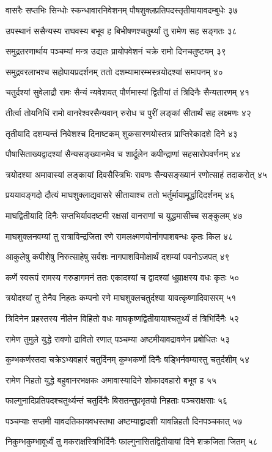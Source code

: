 वासरैः सप्तभिः सिन्धोः स्कन्धावारनिवेशनम्
पौषशुक्लप्रतिपदस्तृतीयायावदम्बुधेः ३७

उपस्थानं ससैन्यस्य राघवस्य बभूव ह
बिभीषणश्चतुर्थ्यां तु रामेण सह सङ्गतः ३८

समुद्रतरणार्थाय पञ्चम्यां मन्त्र उद्यतः
प्रायोपवेशनं चक्रे रामो दिनचतुष्टयम् ३९

समुद्रवरलाभश्च सहोपायप्रदर्शनम्
ततो दशम्यामारम्भस्त्रयोदश्यां समापनम् ४०

चतुर्दश्यां सुवेलाद्रौ रामः सैन्यं न्यवेशयत्
पौर्णमास्यां द्वितीयां तं त्रिदिनैः सैन्यतारणम् ४१

तीर्त्वा तोयनिधिं रामो वानरेश्वरसैन्यवान्
रुरोध च पुरीं लङ्कां सीतार्थं सह लक्ष्मणः ४२

तृतीयादि दशम्यन्तं निवेशश्च दिनाष्टकम्
शुकसारणयोस्तत्र प्राप्तिरेकादशे दिने ४३

पौषासिताख्यद्वादश्यां सैन्यसङ्ख्यानमेव च
शार्दूलेन कपीन्द्राणां सहसारोपवर्णनम् ४४

त्रयोदश्या अमावास्यां लङ्कायां दिवसैस्त्रिभिः
रावणः सैन्यसङ्ख्यानं रणोत्साहं तदाकरोत् ४५

प्रययावङ्गदो दौत्यं माघशुक्लाद्यवासरे
सीतायाश्च ततो भर्तुर्मायामूर्द्धादिदर्शनम् ४६

माघद्वितीयादि दिनैः सप्तभिर्यावदष्टमी
रक्षसां वानराणां च युद्धमासीच्च सङ्कुलम् ४७

माघशुक्लनवम्यां तु रात्राविन्द्रजिता रणे
रामलक्ष्मणयोर्नागपाशबन्धः कृतः किल ४८

आकुलेषु कपीशेषु निरुत्साहेषु सर्वशः
नागपाशविमोक्षार्थं दशम्यां पवनोऽजपत् ४९

कर्णे स्वरूपं रामस्य गरुडागमनं ततः
एकादश्यां च द्वादश्यां धूम्राक्षस्य वधः कृतः ५०

त्रयोदश्यां तु तेनैव निहतः कम्पनो रणे
माघशुक्लचतुर्दश्या यावत्कृष्णादिवासरम् ५१

त्रिदिनेन प्रहस्तस्य नीलेन विहितो वधः
माघकृष्णद्वितीयायाश्चतुर्थ्यं तं त्रिभिर्दिनैः ५२

रामेण तुमुले युद्धे रावणो द्रावितो रणात्
पञ्चम्या अष्टमीयावद्रावणेन प्रबोधितः ५३

कुम्भकर्णस्तदा चक्रेऽभ्यवहारं चतुर्दिनम्
कुम्भकर्णो दिनैः षड्भिर्नवम्यास्तु चतुर्दशीम् ५४

रामेण निहतो युद्धे बहुवानरभक्षकः
अमावास्यादिने शोकादवहारो बभूव ह ५५

फाल्गुनादिप्रतिपदश्चतुर्थ्यन्तं चतुर्दिनैः
बिसतन्तुप्रभृतयो निहताः पञ्चराक्षसाः ५६

पञ्चम्याः सप्तमी यावदतिकायवधस्तथा
अष्टम्याद्वादशी यावन्निहतौ दिनपञ्चकात् ५७

निकुम्भकुम्भावूर्ध्वं तु मकराक्षस्त्रिभिर्दिनैः
फाल्गुनासितद्वितीयायां दिने शक्रजिता जितम् ५८

